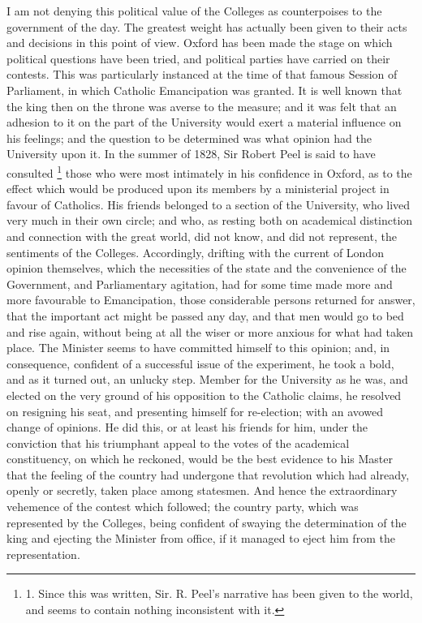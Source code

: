 I am not denying this
political value of the Colleges as counterpoises to the government of
the day. The greatest weight has actually been given to their acts and
decisions in this point of view. Oxford has been made the stage on
which political questions have been tried, and political parties have
carried on their contests. This was particularly instanced at the time
of that famous Session of Parliament, in which Catholic Emancipation
was granted. It is well known that the king then on the throne was
averse to the measure; and it was felt that an adhesion to it on the
part of the University would exert a material influence on his
feelings; and the question to be determined was what opinion had the
University upon it. In the summer of 1828, Sir Robert Peel is said to
have consulted \footnote{1. Since this was written,
Sir. R. Peel's narrative has been given to the world, and seems to
contain nothing inconsistent with it.} those who
were most intimately in his confidence in Oxford, as to the effect
which would be produced upon its members by a ministerial
project in favour of Catholics. His friends belonged to a section of
the University, who lived very much in their own circle; and who, as
resting both on academical distinction and connection with the great
world, did not know, and did not represent, the sentiments of the
Colleges. Accordingly, drifting with the current of London opinion
themselves, which the necessities of the state and the convenience of
the Government, and Parliamentary agitation, had for some time made
more and more favourable to Emancipation, those considerable persons
returned for answer, that the important act might be passed any day,
and that men would go to bed and rise again, without being at all the
wiser or more anxious for what had taken place. The Minister seems to
have committed himself to this opinion; and, in consequence, confident
of a successful issue of the experiment, he took a bold, and as it
turned out, an unlucky step. Member for the University as he was, and
elected on the very ground of his opposition to the Catholic claims,
he resolved on resigning his seat, and presenting himself for
re-election; with an avowed change of opinions. He did this, or at
least his friends for him, under the conviction that his triumphant
appeal to the votes of the academical constituency, on which he
reckoned, would be the best evidence to his Master that the feeling of
the country had undergone that revolution which had already, openly or
secretly, taken place among statesmen. And hence the extraordinary
vehemence of the contest which followed; the country party, which was
represented by the Colleges, being confident of swaying the
determination of the king and ejecting the Minister from office, if it
managed to eject him from the representation.

